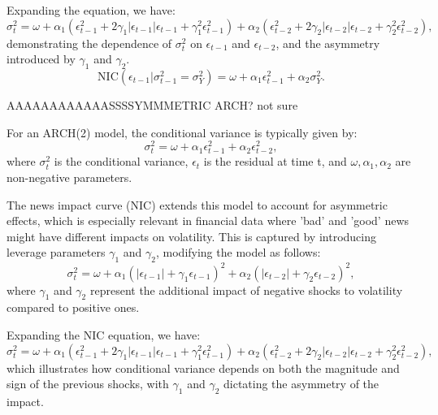 \documentclass{article}
\begin{document}
Expanding the equation, we have:
\begin{equation}
\sigma_t^2 = \omega + \alpha_1 (\epsilon_{t-1}^2 + 2\gamma_1 |\epsilon_{t-1}|\epsilon_{t-1} + \gamma_1^2 \epsilon_{t-1}^2) + \alpha_2 (\epsilon_{t-2}^2 + 2\gamma_2 |\epsilon_{t-2}|\epsilon_{t-2} + \gamma_2^2 \epsilon_{t-2}^2),
\end{equation}
demonstrating the dependence of \( \sigma_t^2 \) on \( \epsilon_{t-1} \) and \( \epsilon_{t-2} \), and the asymmetry introduced by \( \gamma_1 \) and \( \gamma_2 \).
\begin{equation}
\text{NIC}(\epsilon_{t-1} | \sigma_{t-1}^2 = \sigma_Y^2) = \omega + \alpha_1 \epsilon_{t-1}^2 + \alpha_2 \sigma_Y^2.
\end{equation}

AAAAAAAAAAAASSSSYMMMETRIC ARCH? 
 not sure

For an ARCH(2) model, the conditional variance is typically given by:
\begin{equation}
\sigma_t^2 = \omega + \alpha_1 \epsilon_{t-1}^2 + \alpha_2 \epsilon_{t-2}^2,
\end{equation}
where \( \sigma_t^2 \) is the conditional variance, \( \epsilon_t \) is the residual at time t, and \( \omega, \alpha_1, \alpha_2 \) are non-negative parameters.

The news impact curve (NIC) extends this model to account for asymmetric effects, which is especially relevant in financial data where 'bad' and 'good' news might have different impacts on volatility. This is captured by introducing leverage parameters \( \gamma_1 \) and \( \gamma_2 \), modifying the model as follows:
\begin{equation}
\sigma_t^2 = \omega + \alpha_1 (|\epsilon_{t-1}| + \gamma_1 \epsilon_{t-1})^2 + \alpha_2 (|\epsilon_{t-2}| + \gamma_2 \epsilon_{t-2})^2,
\end{equation}
where \( \gamma_1 \) and \( \gamma_2 \) represent the additional impact of negative shocks to volatility compared to positive ones. 

Expanding the NIC equation, we have:
\begin{equation}
\sigma_t^2 = \omega + \alpha_1 (\epsilon_{t-1}^2 + 2\gamma_1 |\epsilon_{t-1}|\epsilon_{t-1} + \gamma_1^2 \epsilon_{t-1}^2) + \alpha_2 (\epsilon_{t-2}^2 + 2\gamma_2 |\epsilon_{t-2}|\epsilon_{t-2} + \gamma_2^2 \epsilon_{t-2}^2),
\end{equation}
which illustrates how conditional variance depends on both the magnitude and sign of the previous shocks, with \(\gamma_1\) and \(\gamma_2\) dictating the asymmetry of the impact.
\end{document}
